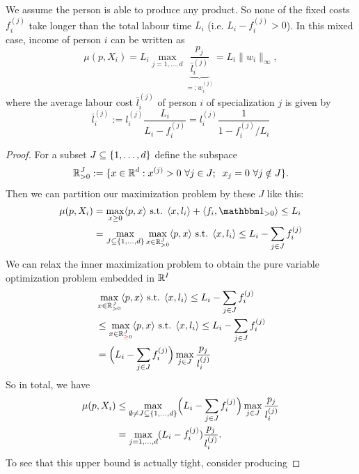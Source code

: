 \begin{lemma}
	We assume the person is able to produce any product. So none of the fixed
	costs \(f_i^{(j)}\) take longer than the total labour time \(L_i\) (i.e.
	\(L_i - f_i^{(j)} > 0\)). In this mixed case, income of person \(i\) can be
	written as		
	\[
		\mu(p, X_i)
		= L_i \max_{j=1,\dots,d}\underbrace{\frac{p_j}{\bar{l}_i^{(j)}}}_{=:w_i^{(j)}}
		= L_i \|w_i\|_\infty,
	\]
	where the average labour cost \(\bar{l}_i^{(j)}\) of person \(i\) of
	specialization \(j\) is given by
	\[
		\bar{l}_i^{(j)}
		:= l_i^{(j)}\frac{L_i}{L_i-f_i^{(j)}}
		= l_i^{(j)}\frac{1}{1-f_i^{(j)}/L_i}
	\]
\end{lemma}
\begin{proof}
	For a subset \(J\subseteq\{1,\dots,d\}\) define the subspace
	\[
		\mathbb{R}_{>0}^J:= \{
			x\in \mathbb{R}^d:
			x^{(j)} > 0\ \forall j\in J;\;\; x_j =0\ \forall j\notin J
		\}.
	\]
	Then we can partition our maximization problem by these \(J\) like this:
	\begin{align*}
		\mu(p, X_i)
		&= \max_{x\ge 0}\langle p, x\rangle \text{ s.t. }
		\langle x, l_i\rangle  + \langle f_i, \ind_{>0}\rangle \le L_i\\
		&= \max_{J \subseteq \{1,\dots,\dims\}}
		\max_{x\in \real_{>0}^J}
		\langle p, x\rangle \text{ s.t. } \langle x, l_i\rangle \le L_i - \sum_{j\in J}f_i^{(j)}
	\end{align*}	
	We can relax the inner maximization problem to obtain the pure variable
	optimization problem embedded in \(\mathbb{R}^I\)
	\begin{align*}
		&\max_{x\in \mathbb{R}_{>0}^J}
		\langle p, x\rangle \text{ s.t. }
		\langle x, l_i\rangle \le L_i - \sum_{j\in J}f_i^{(j)}\\
		&\le 
		\max_{x\in \mathbb{R}_{{\color{red} \ge} 0}^J}
		\langle p, x\rangle \text{ s.t. }
		\langle x, l_i\rangle \le L_i - \sum_{j\in J}f_i^{(j)}\\
		&= \Bigl(L_i - \sum_{j\in J}f_i^{(j)}\Bigr)
		\max_{j\in J} \frac{p_j}{l_i^{(j)}}
	\end{align*}
	So in total, we have
	\begin{align*}
		\mu(p, X_i)
		&\le \max_{\emptyset \neq J\subseteq \{1,\dots,d\}}
		\Bigl(L_i - \sum_{j\in J}f_i^{(j)}\Bigr)
		\max_{j\in J} \frac{p_j}{l_i^{(j)}}\\
		&= \max_{j=1,\dots,d}
		(L_i - f_i^{(j)}) \frac{p_j}{l_i^{(j)}}.
	\end{align*}
	To see that this upper bound is actually tight, consider producing

\end{proof}
